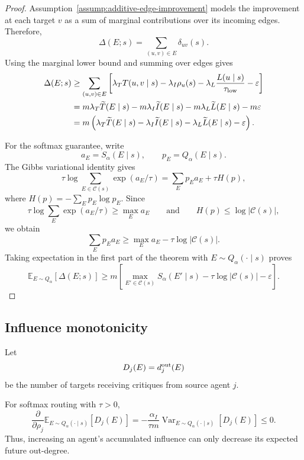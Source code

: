 \begin{proof}
Assumption~\ref{assump:additive-edge-improvement} models the improvement at
each target $v$ as a sum of marginal contributions over its incoming edges.
Therefore,
\[
    \Delta(E;s)
    =
    \sum_{(u,v)\in E}\delta_{uv}(s).
\]
Using the marginal lower bound and summing over edges gives
\[
\begin{aligned}
    \Delta(E;s)
    &\ge
    \sum_{(u,v)\in E}
    \left[
    \lambda_T T(u,v\mid s)
    -
    \lambda_I\rho_u(s)
    -
    \lambda_L\frac{L(u\mid s)}{\tau_{\rm low}}
    -
    \varepsilon
    \right]\\
    &=
    m\lambda_T\widetilde T(E\mid s)
    -
    m\lambda_I\widetilde I(E\mid s)
    -
    m\lambda_L\widetilde L(E\mid s)
    -
    m\varepsilon\\
    &=
    m\left(
    \lambda_T\widetilde T(E\mid s)
    -
    \lambda_I\widetilde I(E\mid s)
    -
    \lambda_L\widetilde L(E\mid s)
    -
    \varepsilon
    \right).
\end{aligned}
\]

For the softmax guarantee, write
\[
    a_E=S_\alpha(E\mid s),
    \qquad
    p_E=Q_\alpha(E\mid s).
\]
The Gibbs variational identity gives
\[
    \tau\log\sum_{E\in\mathcal C(s)}\exp(a_E/\tau)
    =
    \sum_E p_Ea_E+\tau H(p),
\]
where $H(p)=-\sum_Ep_E\log p_E$. Since
\[
    \tau\log\sum_E\exp(a_E/\tau)\ge \max_E a_E
    \qquad\text{and}\qquad
    H(p)\le \log|\mathcal C(s)|,
\]
we obtain
\[
    \sum_E p_Ea_E
    \ge
    \max_E a_E-\tau\log|\mathcal C(s)|.
\]
Taking expectation in the first part of the theorem with
$E\sim Q_\alpha(\cdot\mid s)$ proves
\[
    \mathbb E_{E\sim Q_\alpha}[\Delta(E;s)]
    \ge
    m\left[
    \max_{E'\in\mathcal C(s)}S_\alpha(E'\mid s)
    -
    \tau\log|\mathcal C(s)|
    -
    \varepsilon
    \right].
\]
\end{proof}

\subsection{Influence monotonicity}

Let
\[
    D_j(E)=d_j^{\rm out}(E)
\]
be the number of targets receiving critiques from source agent $j$.

\begin{theorem}
\label{thm:influence-appendix}
For softmax routing with $\tau>0$,
\[
    \frac{\partial}{\partial \rho_j}
    \mathbb E_{E\sim Q_\alpha(\cdot\mid s)}[D_j(E)]
    =
    -
    \frac{\alpha_I}{\tau m}
    \operatorname{Var}_{E\sim Q_\alpha(\cdot\mid s)}[D_j(E)]
    \le 0 .
\]
Thus, increasing an agent's accumulated influence can only decrease its expected
future out-degree.
\end{theorem}

